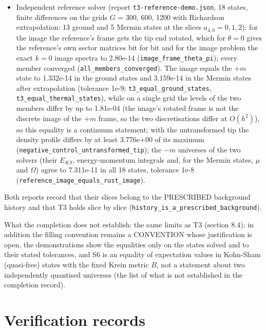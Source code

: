 \documentclass[11pt]{article}
\begin{document}
\begin{itemize}
\item Independent reference solver (report \texttt{t3-refer\allowbreak{}ence-dem\allowbreak{}o.json}, 18 states, finite differences on the grids $G$ = 300, 600, 1200 with Richardson extrapolation: 13 ground and 5 Mermin states at the slices $a_{4,0} = 0, 1, 2$): for the image the reference's frame gets the tip end rotated, which for $\theta = 0$ gives the reference's own sector matrices bit for bit and for the image problem the exact $k = 0$ image spectra to 2.80e-14 (\texttt{image\_fr\allowbreak{}ame\_thet\allowbreak{}a\_pi}); every member converged (\texttt{all\_memb\allowbreak{}ers\_conv\allowbreak{}erged}). The image equals the $+m$ state to 1.332e-14 in the ground states and 3.159e-14 in the Mermin states after extrapolation (tolerance 1e-9; \texttt{t3\_equal\allowbreak{}\_ground\_\allowbreak{}states}, \texttt{t3\_equal\allowbreak{}\_thermal\allowbreak{}\_states}), while on a single grid the levels of the two members differ by up to 1.81e-04 (the image's rotated frame is not the discrete image of the $+m$ frame, so the two discretisations differ at $O(h^2)$), so this equality is a continuum statement; with the untransformed tip the density profile differs by at least 3.776e+00 of its maximum (\texttt{negative\allowbreak{}\_control\allowbreak{}\_untrans\allowbreak{}formed\_t\allowbreak{}ip}); the $-m$ universes of the two solvers (their $E_{KS}$, energy-momentum integrals and, for the Mermin states, $\mu$ and $\Omega$) agree to 7.311e-11 in all 18 states, tolerance 1e-8 (\texttt{referenc\allowbreak{}e\_image\_\allowbreak{}equals\_r\allowbreak{}ust\_imag\allowbreak{}e}).
\end{itemize}

Both reports record that their slices belong to the PRESCRIBED background history and that T3 holds slice by slice (\texttt{history\_\allowbreak{}is\_a\_pre\allowbreak{}scribed\_\allowbreak{}backgrou\allowbreak{}nd}).

What the completion does not establish: the same limits as T3 (section 8.4); in addition the filling convention remains a CONVENTION whose justification is open, the demonstrations show the equalities only on the states solved and to their stated tolerances, and S6 is an equality of expectation values in Kohn-Sham (quasi-free) states with the fixed Krein metric $B$, not a statement about two independently quantised universes (the list of what is not established in the completion record).

\section{Verification records}
\end{document}
